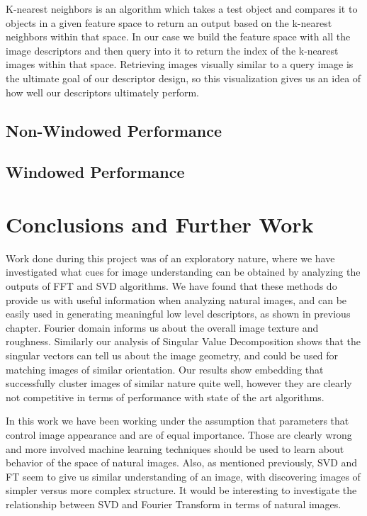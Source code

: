 \documentclass{report}
\begin{document}
K-nearest neighbors is an algorithm which takes a test object and compares it to objects in a given feature space to return an output based on the k-nearest neighbors within that space. In our case we build the feature space with all the image descriptors and then query into it to return the index of the k-nearest images within that space. Retrieving images visually similar to a query image is the ultimate goal of our descriptor design, so this visualization gives us an idea of how well our descriptors ultimately perform.

\section{Non-Windowed Performance}

\section{Windowed Performance}

\chapter{Conclusions and Further Work}
\label{chap:Conclusions}
Work done during this project was of an exploratory nature, where we have investigated what cues for image understanding can be obtained by analyzing the outputs of FFT and SVD algorithms. We have found that these methods do provide us with useful information when analyzing natural images, and can be easily used in generating meaningful low level descriptors, as shown in previous chapter. Fourier domain informs us about the overall image texture and roughness. Similarly our analysis of Singular Value Decomposition shows that the singular vectors can tell us about the image geometry, and could be used for matching images of similar orientation. Our results show embedding that successfully cluster images of similar nature quite well, however they are clearly not competitive in terms of performance with state of the art algorithms.

In this work we have been working under the assumption that parameters that control image appearance and are of equal importance. Those are clearly wrong and more involved machine learning techniques should be used to learn about behavior of the space of natural images. Also, as mentioned previously, SVD and FT seem to give us similar understanding of an image, with discovering images of simpler versus more complex structure. It would be interesting to investigate the relationship between SVD and Fourier Transform in terms of natural images. 
\end{document}
